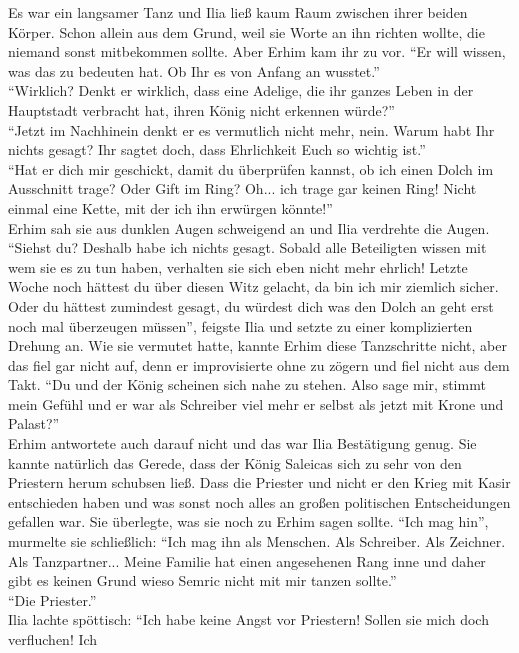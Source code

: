Es war ein langsamer Tanz und Ilia ließ kaum Raum zwischen ihrer beiden Körper. Schon allein aus 
dem Grund, weil sie Worte an ihn richten wollte, die niemand sonst mitbekommen sollte. Aber Erhim 
kam ihr zu vor. ``Er will wissen, was das zu bedeuten hat. Ob Ihr es von Anfang an wusstet.''\\
``Wirklich? Denkt er wirklich, dass eine Adelige, die ihr ganzes Leben in der Hauptstadt verbracht 
hat, ihren König nicht erkennen würde?''\\
``Jetzt im Nachhinein denkt er es vermutlich nicht mehr, nein. Warum habt Ihr nichts gesagt? Ihr 
sagtet doch, dass Ehrlichkeit Euch so wichtig ist.''\\
``Hat er dich mir geschickt, damit du überprüfen kannst, ob ich einen Dolch im Ausschnitt trage? 
Oder Gift im Ring? Oh... ich trage gar keinen Ring! Nicht einmal eine Kette, mit der ich ihn 
erwürgen könnte!''\\
Erhim sah sie aus dunklen Augen schweigend an und Ilia verdrehte die Augen. ``Siehst du? Deshalb 
habe ich nichts gesagt. Sobald alle Beteiligten wissen mit wem sie es zu tun haben, verhalten sie 
sich eben nicht mehr ehrlich! Letzte Woche noch hättest du über diesen Witz gelacht, da bin ich mir 
ziemlich sicher. Oder du hättest zumindest gesagt, du würdest dich was den Dolch an geht erst noch 
mal überzeugen müssen'', feigste Ilia und setzte zu einer komplizierten Drehung an. Wie sie 
vermutet hatte, kannte Erhim diese Tanzschritte nicht, aber das fiel gar nicht auf, denn er 
improvisierte ohne zu zögern und fiel nicht aus dem Takt. ``Du und der König scheinen sich nahe zu 
stehen. Also sage mir, stimmt mein Gefühl und er war als Schreiber viel mehr er selbst als 
jetzt mit Krone und Palast?''\\
Erhim antwortete auch darauf nicht und das war Ilia Bestätigung genug. Sie kannte natürlich das 
Gerede, dass der König Saleicas sich zu sehr von den Priestern herum schubsen ließ. Dass die 
Priester und nicht er den Krieg mit Kasir entschieden haben und was sonst noch alles an großen 
politischen Entscheidungen gefallen war. Sie überlegte, was sie noch zu Erhim sagen sollte. ``Ich 
mag hin'', murmelte sie schließlich: ``Ich mag ihn als Menschen. Als Schreiber. Als Zeichner. Als 
Tanzpartner... Meine Familie hat einen angesehenen Rang inne und daher gibt es keinen 
Grund wieso Semric nicht mit mir tanzen sollte.''\\
``Die Priester.''\\
Ilia lachte spöttisch: ``Ich habe keine Angst vor Priestern! Sollen sie mich doch verfluchen! Ich 
